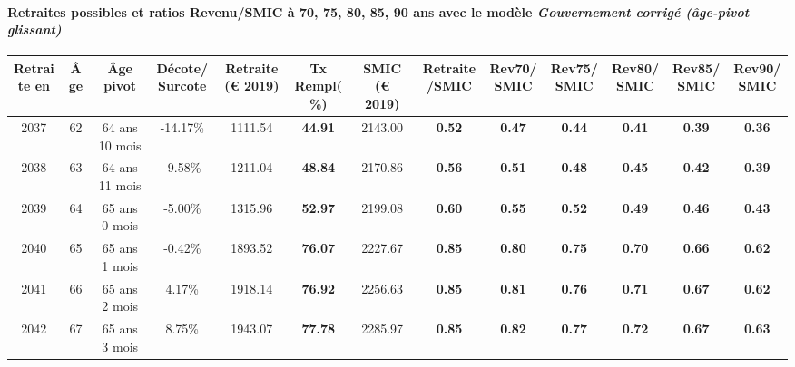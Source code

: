 \paragraph{Retraites possibles et ratios Revenu/SMIC à 70, 75, 80, 85, 90 ans avec le modèle \emph{Gouvernement corrigé (âge-pivot glissant)}}  
 
{ \scriptsize \begin{center} 
\begin{tabular}[htb]{|c|c||c|c||c|c||c||c|c|c|c|c|c|} 
\hline 
 Retraite en &  Âge &  Âge pivot &  Décote/Surcote &  Retraite (\euro{} 2019) &  Tx Rempl(\%) &  SMIC (\euro{} 2019) &  Retraite/SMIC &  Rev70/SMIC &  Rev75/SMIC &  Rev80/SMIC &  Rev85/SMIC &  Rev90/SMIC \\ 
\hline \hline 
 2037 &  62 &  64 ans 10 mois &  -14.17\% &  1111.54 &  {\bf 44.91} &  2143.00 &  {\bf {\color{red} 0.52}} &  {\bf {\color{red} 0.47}} &  {\bf {\color{red} 0.44}} &  {\bf {\color{red} 0.41}} &  {\bf {\color{red} 0.39}} &  {\bf {\color{red} 0.36}} \\ 
\hline 
 2038 &  63 &  64 ans 11 mois &  -9.58\% &  1211.04 &  {\bf 48.84} &  2170.86 &  {\bf {\color{red} 0.56}} &  {\bf {\color{red} 0.51}} &  {\bf {\color{red} 0.48}} &  {\bf {\color{red} 0.45}} &  {\bf {\color{red} 0.42}} &  {\bf {\color{red} 0.39}} \\ 
\hline 
 2039 &  64 &  65 ans 0 mois &  -5.00\% &  1315.96 &  {\bf 52.97} &  2199.08 &  {\bf {\color{red} 0.60}} &  {\bf {\color{red} 0.55}} &  {\bf {\color{red} 0.52}} &  {\bf {\color{red} 0.49}} &  {\bf {\color{red} 0.46}} &  {\bf {\color{red} 0.43}} \\ 
\hline 
 2040 &  65 &  65 ans 1 mois &  -0.42\% &  1893.52 &  {\bf 76.07} &  2227.67 &  {\bf {\color{red} 0.85}} &  {\bf {\color{red} 0.80}} &  {\bf {\color{red} 0.75}} &  {\bf {\color{red} 0.70}} &  {\bf {\color{red} 0.66}} &  {\bf {\color{red} 0.62}} \\ 
\hline 
 2041 &  66 &  65 ans 2 mois &  4.17\% &  1918.14 &  {\bf 76.92} &  2256.63 &  {\bf {\color{red} 0.85}} &  {\bf {\color{red} 0.81}} &  {\bf {\color{red} 0.76}} &  {\bf {\color{red} 0.71}} &  {\bf {\color{red} 0.67}} &  {\bf {\color{red} 0.62}} \\ 
\hline 
 2042 &  67 &  65 ans 3 mois &  8.75\% &  1943.07 &  {\bf 77.78} &  2285.97 &  {\bf {\color{red} 0.85}} &  {\bf {\color{red} 0.82}} &  {\bf {\color{red} 0.77}} &  {\bf {\color{red} 0.72}} &  {\bf {\color{red} 0.67}} &  {\bf {\color{red} 0.63}} \\ 
\hline 
\hline 
\end{tabular} 
\end{center} } 
